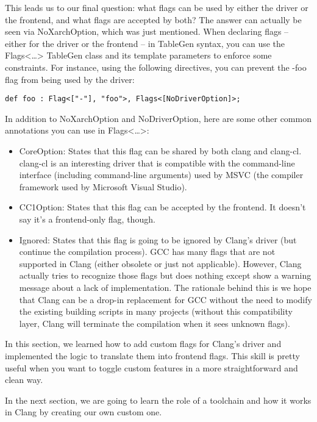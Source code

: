 This leads us to our final question: what flags can be used by either the driver or the frontend, and what flags are accepted by both? The answer can actually be seen via NoXarchOption, which was just mentioned. When declaring flags – either for the driver or the frontend – in TableGen syntax, you can use the Flags<…> TableGen class and its template parameters to enforce some constraints. For instance, using the following directives, you can prevent the -foo flag from being used by the driver:

\begin{lstlisting}[style=styleJavaScript]
def foo : Flag<["-"], "foo">, Flags<[NoDriverOption]>;
\end{lstlisting}

In addition to NoXarchOption and NoDriverOption, here are some other common annotations you can use in Flags<…>:

\begin{itemize}
\item CoreOption: States that this flag can be shared by both clang and clang-cl. clang-cl is an interesting driver that is compatible with the command-line interface (including command-line arguments) used by MSVC (the compiler framework used by Microsoft Visual Studio).

\item CC1Option: States that this flag can be accepted by the frontend. It doesn't say it's a frontend-only flag, though.

\item Ignored: States that this flag is going to be ignored by Clang's driver (but continue the compilation process). GCC has many flags that are not supported in Clang (either obsolete or just not applicable). However, Clang actually tries to recognize those flags but does nothing except show a warning message about a lack of implementation. The rationale behind this is we hope that Clang can be a drop-in replacement for GCC without the need to modify the existing building scripts in many projects (without this compatibility layer, Clang will terminate the compilation when it sees unknown flags).
\end{itemize}

 In this section, we learned how to add custom flags for Clang's driver and implemented  the logic to translate them into frontend flags. This skill is pretty useful when you want to  toggle custom features in a more straightforward and clean way.
 
 In the next section, we are going to learn the role of a toolchain and how it works in Clang  by creating our own custom one.
 
 
 
 
 
 
 
 
 
 
 
 
 
 
 
 
 
 
 
 
 
 
 
 
 
 
 
 